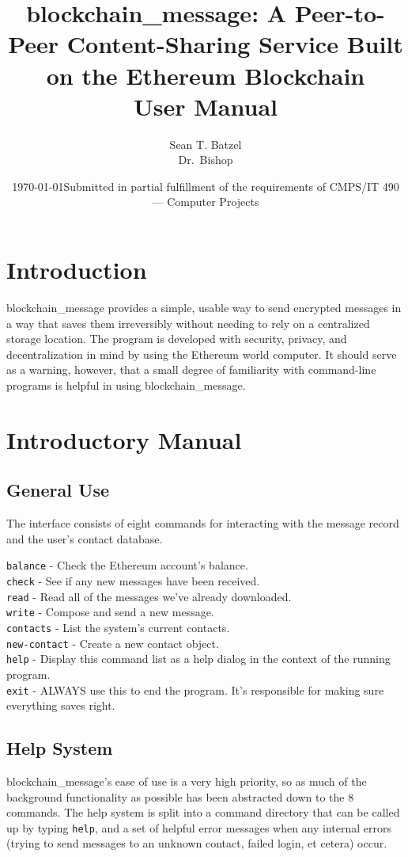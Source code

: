 \documentclass[titlepage]{report}
\title{blockchain\_message: A Peer-to-Peer Content-Sharing Service Built on the Ethereum Blockchain\\\large User Manual}
\author{Sean T. Batzel\\Dr.\ Bishop}
\date{\today\endgraf\bigskip Submitted in partial fulfillment of the requirements of CMPS/IT 490 --- Computer Projects}
\begin{document}
\maketitle

\tableofcontents

\nocite{*}

\pagebreak

\section{Introduction}
blockchain\_message provides a simple, usable way to send encrypted messages in a way that saves them irreversibly without needing to rely on a centralized storage location. The program is developed with security, privacy, and decentralization in mind by using the \gls{Ethereum} world computer. It should serve as a warning, however, that a small degree of familiarity with \gls{command-line} programs is helpful in using blockchain\_message.

\section{Introductory Manual}
\subsection{General Use}
The interface consists of eight commands for interacting with the message record and the user's contact database.

\texttt{balance} - Check the Ethereum account's balance.\\
\texttt{check} - See if any new messages have been received.\\
\texttt{read} - Read all of the messages we've already downloaded.\\
\texttt{write} - Compose and send a new message.\\
\texttt{contacts} - List the system's current contacts.\\
\texttt{new-contact} - Create a new contact object.\\
\texttt{help} - Display this command list as a help dialog in the context of the running program.\\
\texttt{exit} - ALWAYS use this to end the program. It's responsible for making sure everything saves right.\\

\subsection{Help System}
blockchain\_message's ease of use is a very high priority, so as much of the background functionality as possible has been abstracted down to the 8 commands. The help system is split into a command directory that can be called up by typing \texttt{help}, and a set of helpful error messages when any internal errors (trying to send messages to an unknown contact, failed login, et cetera) occur.
\end{document}
